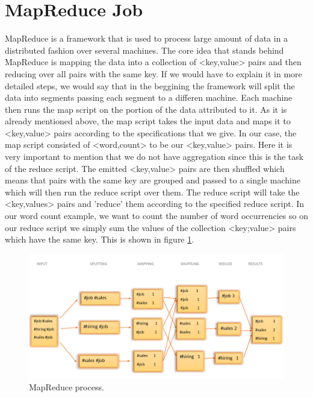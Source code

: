 \documentclass{article}
\newcommand*\setcaptioncitation[1]{\def\captioncitation{\textit{Source:}~#1}}
\let\captioncitation\relax
\begin{document}
        \section{MapReduce Job}

MapReduce is a framework that is used to process large amount of data in a distributed fashion over several machines. The core idea that stands behind MapReduce is mapping the data into a collection of <key,value> pairs and then reducing over all pairs with the same key. If we would have to explain it in more detailed steps, we would say that in the beggining the framework will split the data into segments passing each segment to a differen machine. Each machine then runs the map script on the portion of the data attributed to it. As it is already mentioned above, the map script takes the input data and maps it to <key,value> pairs according to the specifications that we give. In our case, the map script consisted of <word,count> to be our <key,value> pairs. Here it is very important to mention that we do not have aggregation since this is the task of the reduce script. The emitted <key,value> pairs are then shuffled which means that pairs with the same key are grouped and passed to a single machine which will then run the reduce script over them. The reduce script will take the <key,values> pairs and 'reduce' them according to the specified reduce script. In our word count example, we want to count the number of word occurrencies so on our reduce script we simply sum the values of the collection <key;value> pairs which have the same key. This is shown in figure \ref{fig:MapReduce}. 

\begin{figure}[H]
            \centering 
            \includegraphics[width=1\linewidth]{./img/MapReduce.png}
            \setcaptioncitation{self-made}
            \caption{MapReduce process.}
            \label{fig:MapReduce}
        \end{figure}
\end{document}
